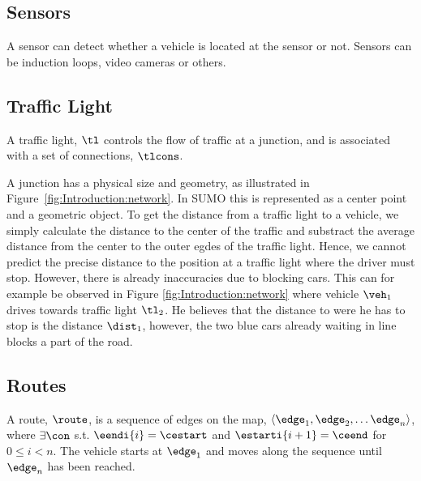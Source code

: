 \subsection{Sensors}
A sensor can detect whether a vehicle is located at the sensor or not. Sensors can be induction loops, video cameras or others.

\subsection{Traffic Light}
A traffic light, $\tl$ controls the flow of traffic at a junction, and is associated with a set of connections, $\tlcons$. %

A junction has a physical size and geometry, as illustrated in Figure~\ref{fig:Introduction:network}.
In SUMO this is represented as a center point and a geometric object.
To get the distance from a traffic light to a vehicle, we simply calculate the distance to the center of the traffic and substract the average distance from the center to the outer egdes of the traffic light. 
Hence, we cannot predict the precise distance to the position at a traffic light where the driver must stop.
However, there is already inaccuracies due to blocking cars.
This can for example be observed in Figure \ref{fig:Introduction:network} where vehicle $\veh_1$ drives towards traffic light $\tl_2$. %
He believes that the distance to were he has to stop is the distance $\dist_1$, however, the two blue cars already waiting in line blocks a part of the road.

\subsection{Routes}
A route, $\route$, is a sequence of edges on the map, $\langle \edge_1, \edge_2, \dots \edge_n \rangle$, where $\exists \con$ s.t. $\eendi{i} = \cestart$ and $\estarti{i+1} = \ceend$ for $0\leq i< n$.
The vehicle starts at $\edge_1$ and moves along the sequence until $\edge_n$ has been reached.


